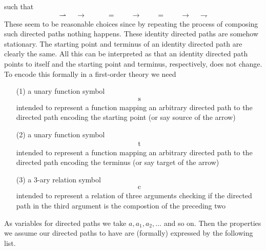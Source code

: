 such that
\begin{align*}
  \rightharpoonup
  \quad
  \longrightarrow
  \qquad
  &=
  \qquad
  \longrightarrow  
  \qquad
  =
  \qquad
  \longrightarrow
  \quad
  \rightharpoondown
\end{align*}
These seem to be reasonable choices since by repeating the process of composing such directed paths nothing happens. These identity directed paths are somehow stationary. The starting point and terminus of an identity directed path are clearly the same. All this can be interpreted as that an identity directed path points to itself and the starting point and terminus, respectively, does not change.
\\
To encode this formally in a first-order theory we need
\begin{enumerate}
\item[(1)]
a unary function symbol
\begin{align*}
  \mathrm{s}
\end{align*}
intended to represent a function mapping an arbitrary directed path to the directed path encoding the starting point (or say source of the arrow)
\item[(2)]
a unary function symbol
\begin{align*}
  \mathrm{t}
\end{align*}
intended to represent a function mapping an arbitrary directed path to the directed path encoding the terminus (or say target of the arrow)
\item[(3)]
a $3$-ary relation symbol
\begin{align*}
  \mathrm{c}
\end{align*}
intended to represent a relation of three arguments checking if the directed path in the third argument is the compostion of the preceding two
\end{enumerate}
As variables for directed paths we take $a,a_{1},a_{2},\ldots$ and so on. Then the properties we assume our directed paths to have are (formally) expressed by the following list.

